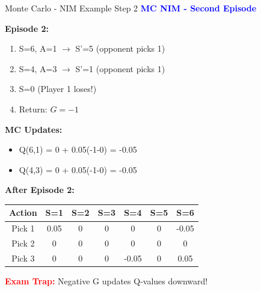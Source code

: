 \documentclass[8pt]{beamer}
\begin{document}
	\begin{frame}{Monte Carlo - NIM Example Step 2}
		\fontsize{6.5}{7.5}\selectfont
		\textcolor{blue}{\textbf{MC NIM - Second Episode}}
		
		\textbf{Episode 2:}
		\begin{enumerate}
			\item S=6, A=1 $\rightarrow$ S'=5 (opponent picks 1)
			\item S=4, A=3 $\rightarrow$ S'=1 (opponent picks 1)
			\item S=0 (Player 1 loses!)
			\item Return: $G = -1$
		\end{enumerate}
		
		\textbf{MC Updates:}
		\begin{itemize}
			\item Q(6,1) = 0 + 0.05(-1-0) = -0.05
			\item Q(4,3) = 0 + 0.05(-1-0) = -0.05
		\end{itemize}
		
		\textbf{After Episode 2:}
		\begin{tabular}{|c|c|c|c|c|c|c|}
			\hline
			Action & S=1 & S=2 & S=3 & S=4 & S=5 & S=6 \\
			\hline
			Pick 1 & 0.05 & 0 & 0 & 0 & 0 & -0.05 \\
			\hline
			Pick 2 & 0 & 0 & 0 & 0 & 0 & 0 \\
			\hline
			Pick 3 & 0 & 0 & 0 & -0.05 & 0 & 0.05 \\
			\hline
		\end{tabular}
		
		\textcolor{red}{\textbf{Exam Trap:}} Negative G updates Q-values downward!
	\end{frame}
	
\end{document}
